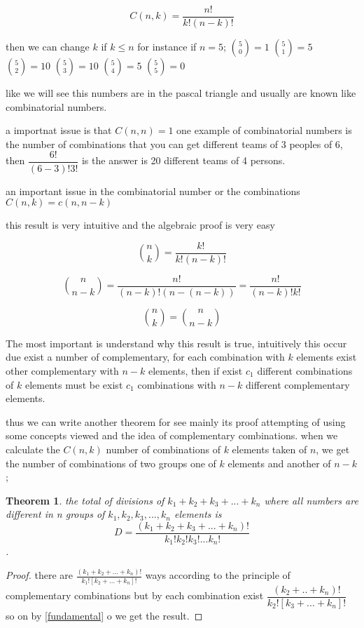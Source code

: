 \documentclass[10pt,a4paper]{article}
\newtheorem{theorem}{Theorem}[section]
\begin{document}
\begin{equation}
\label{combination}
 C(n,k) = \dfrac {n!}{k!(n-k)!} 
\end{equation}

then we can change $k$ if $k\leq n$  for instance if $n=5$; 
${5 \choose 0}=1$
${5 \choose 1}=5$
${5 \choose 2}=10$
${5 \choose 3}=10$
${5 \choose 4}=5$
${5 \choose 5}=0$


like we will see this numbers are in the pascal triangle and usually are known like combinatorial numbers.

a importnat issue is that $C(n,n)=1$
one example of combinatorial numbers is the number of combinations that you can get different teams of 3 peoples of 6, then $\dfrac{6!}{(6-3)!3!}$ is the answer is 20 different teams of 4 persons.

an important issue in the combinatorial number or the combinations $C(n,k)=c(n,n-k)$


 this result is very intuitive and the algebraic proof is very easy 

$${n \choose k}= \frac{k!}{k!(n-k)!}$$

$${n \choose n-k}=\frac{n!}{(n-k)!(n-(n-k))}=\dfrac{n!}{(n-k)!k!}$$

$${n \choose k}={n \choose n-k}$$ 

The most important is understand why this result is true, intuitively this occur due exist  a number of complementary, for each combination with $k$ elements exist other complementary with $n-k$ elements, then if exist $c_{1}$ different combinations of $k$ elements must be exist $c_{1}$ combinations with $n-k$ different complementary elements.  

thus we can write another theorem for see mainly its proof attempting of using  some  concepts viewed and the idea of complementary combinations. when we calculate the $C(n,k)$  number of combinations of $k$ elements taken of $n$, we get the number of combinations of two  groups one of $k$ elements and another of $n-k$;


\begin{theorem}
the total of divisions of $k_{1}+k_{2}+k_{3}+...+k_{n}$ where all numbers are different in n groups of $k_{1}, k_{2},k_{3},...,k_{n}$ elements is $$D=\frac{(k_{1}+k_{2}+k_{3}+...+k_{n})!}{k_{1}!k_{2}!k_{3}!...k_{n}!}$$.

\end{theorem}


\begin{proof}

there are $\frac{(k_{1}+k_{2}+...+k_{n})!}{k_{1}![k_{2}+...+k_{n}]!}$ ways according to the principle of complementary combinations but by each combination exist $\dfrac{(k_{2}+..+k_{n})!}{k_{2}![k_{3}+...+k_{n}]!}$ so on  by \ref{fundamental} o we get the result.
\end{proof}
\end{document}
